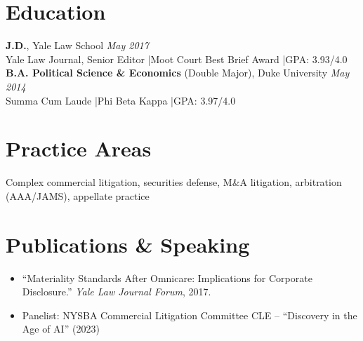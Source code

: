\documentclass[11pt,a4paper]{article}
\begin{document}
\section{Education}
\noindent\textbf{J.D.}, Yale Law School \hfill \textit{May 2017}\\
Yale Law Journal, Senior Editor \quad|\quad Moot Court Best Brief Award \quad|\quad GPA: 3.93/4.0\\[3pt]
\noindent\textbf{B.A. Political Science \& Economics} (Double Major), Duke University \hfill \textit{May 2014}\\
Summa Cum Laude \quad|\quad Phi Beta Kappa \quad|\quad GPA: 3.97/4.0

\section{Practice Areas}
Complex commercial litigation, securities defense, M\&A litigation, arbitration (AAA/JAMS), appellate practice

\section{Publications \& Speaking}
\begin{itemize}
  \item ``Materiality Standards After Omnicare: Implications for Corporate Disclosure.'' \textit{Yale Law Journal Forum}, 2017.
  \item Panelist: NYSBA Commercial Litigation Committee CLE -- ``Discovery in the Age of AI'' (2023)
\end{itemize}
\end{document}
